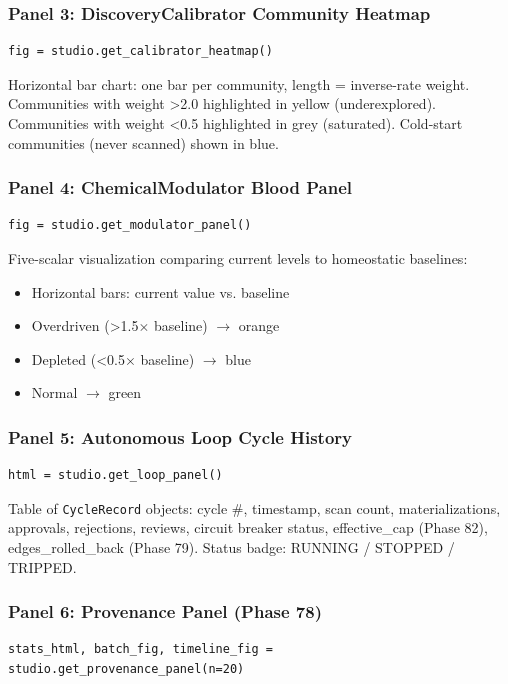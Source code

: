 \subsubsection{Panel 3: DiscoveryCalibrator Community Heatmap}
\begin{lstlisting}
fig = studio.get_calibrator_heatmap()
\end{lstlisting}
Horizontal bar chart: one bar per community, length = inverse-rate weight. Communities with weight \textgreater  2.0 highlighted in yellow (under\-explored). Communities with weight \textless  0.5 highlighted in grey (saturated). Cold-start communities (never scanned) shown in blue.

\subsubsection{Panel 4: ChemicalModulator Blood Panel}
\begin{lstlisting}
fig = studio.get_modulator_panel()
\end{lstlisting}
Five-scalar visua\-lization comparing current levels to homeostatic baselines:
\begin{itemize}
\item Horizontal bars: current value vs. baseline
\item Overdriven (\textgreater  1.5$\times$ baseline) $\to$ orange
\item Depleted (\textless  0.5$\times$ baseline) $\to$ blue
\item Normal $\to$ green

\end{itemize}
\subsubsection{Panel 5: Autonomous Loop Cycle History}
\begin{lstlisting}
html = studio.get_loop_panel()
\end{lstlisting}
Table of \texttt{CycleRecord} objects: cycle \#, timestamp, scan count, mater\-ializations, approvals, rejections, reviews, circuit breaker status, effective\_cap (Phase 82), edges\_rolled\_back (Phase 79). Status badge: RUNNING / STOPPED / TRIPPED.

\subsubsection{Panel 6: Provenance Panel (Phase 78)}
\begin{lstlisting}
stats_html, batch_fig, timeline_fig = studio.get_provenance_panel(n=20)
\end{lstlisting}

